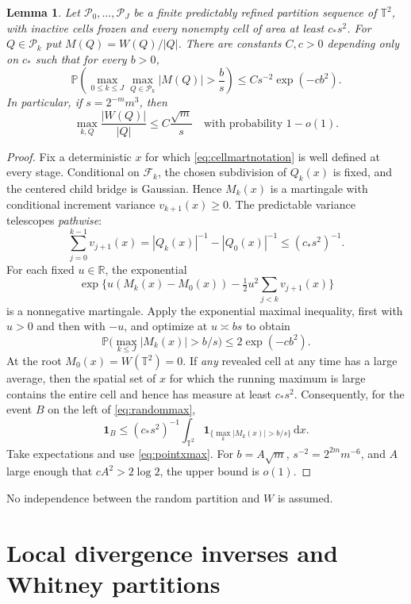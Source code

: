 \documentclass[11pt]{article}
\newtheorem{lemma}[lemma]{Lemma}
\theoremstyle{definition}
\theoremstyle{remark}
\numberwithin{equation}{section}
\newcommand{\T}{\mathbb T}
\newcommand{\R}{\mathbb R}
\newcommand{\Pp}{\mathbb P}
\newcommand{\F}{\mathcal F}
\newcommand{\pr}{\mathcal P}
\newcommand{\one}{\mathbf 1}
\newcommand{\dd}{\,\mathrm d}
\begin{document}
\begin{lemma}\label{lem:randommax}
Let $\pr_0,\ldots,\pr_J$ be a finite predictably refined partition sequence
of $\T^2$, with inactive cells frozen and every nonempty cell of area at
least $c_*s^2$. For $Q\in\pr_k$ put $M(Q)=W(Q)/|Q|$. There are
constants $C,c>0$ depending only on $c_*$ such that for every $b>0$,
\begin{equation}\label{eq:randommax}
 \Pp\!\left(\max_{0\le k\le J}\max_{Q\in\pr_k}
       |M(Q)|>\frac b s\right)
 \le Cs^{-2}\exp(-cb^2).
\end{equation}
In particular, if $s=2^{-m}m^3$, then
\begin{equation}\label{eq:randommaxwhp}
 \max_{k,Q}\frac{|W(Q)|}{|Q|}\le C\frac{\sqrt m}{s}
 \quad\text{with probability }1-o(1).
\end{equation}
\end{lemma}
\begin{proof}
Fix a deterministic $x$ for which \eqref{eq:cellmartnotation}
is well defined at every stage. Conditional on $\F_k$, the chosen
subdivision of $Q_k(x)$ is fixed, and the centered child bridge is
Gaussian. Hence $M_k(x)$ is a martingale with conditional increment
variance $v_{k+1}(x)\ge0$. The predictable
variance telescopes \emph{pathwise}:
\[
 \sum_{j=0}^{k-1}v_{j+1}(x)
 =|Q_k(x)|^{-1}-|Q_0(x)|^{-1}\le(c_*s^2)^{-1}.
\]
For each fixed $u\in\R$, the exponential
\[
 \exp\Big\{u(M_k(x)-M_0(x))-
              \tfrac12u^2\sum_{j<k}v_{j+1}(x)\Big\}
\]
is a nonnegative martingale. Apply the exponential maximal
inequality, first with $u>0$ and then with $-u$, and optimize
at $u\asymp bs$ to obtain
\begin{equation}\label{eq:pointxmax}
 \Pp\bigl(\max_{k\le J}|M_k(x)|>b/s\bigr)
 \le 2\exp(-c b^2).
\end{equation}
At the root $M_0(x)=W(\T^2)=0$. If \emph{any}
revealed cell at any time has a large average, then the spatial
set of $x$ for which the running maximum is large contains the
entire cell and hence has measure at least $c_*s^2$.
Consequently, for the event $B$ on the left of \eqref{eq:randommax},
\[
 \one_B\le (c_*s^2)^{-1}\int_{\T^2}
       \one_{\{\max_k|M_k(x)|>b/s\}}\dd x.
\]
Take expectations and use \eqref{eq:pointxmax}. For $b=A\sqrt m$,
$s^{-2}=2^{2m}m^{-6}$, and $A$ large enough that
$cA^2>2\log 2$, the upper bound is $o(1)$.
\end{proof}
No independence between the random partition and $W$ is assumed.


\section{Local divergence inverses and Whitney partitions}\label{sec:geom}
\end{document}
